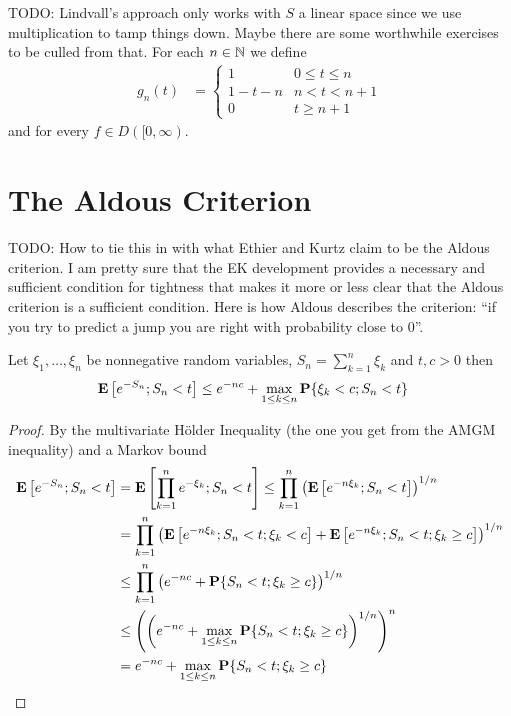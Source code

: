 TODO: Lindvall's approach only works with $S$ a linear space since we use multiplication to tamp things down.  Maybe there are some worthwhile exercises to be culled from that.
For each $n \in \mathbb{N}$ we define 
\begin{align*}
g_n(t) &= \begin{cases}
1 & 0 \leq t \leq n \\
1 - t - n & n < t < n + 1 \\
0 & t \geq n+1
\end{cases}
\end{align*}
and for every $f \in D([0,\infty)$.

\section{The Aldous Criterion}

TODO: How to tie this in with what Ethier and Kurtz claim to be the Aldous criterion.  I am pretty sure that the EK development provides a necessary and sufficient condition for tightness that makes it more or less clear that the Aldous criterion is a sufficient condition.
Here is how Aldous describes the criterion: ``if you try to predict a jump you are right with probability close to 0''.

\begin{lem}\label{AldousCriterionExponentialEstimate}Let $\xi_1, \dotsc, \xi_n$ be nonnegative random variables, $S_n = \sum_{k=1}^n \xi_k$ and $t,c > 0$ then
\begin{align*}
\textbf{E}\left[e^{-S_n}; S_n < t\right] &\leq e^{-nc} + \max_{1 \leq k \leq n} \textbf{P}\{\xi_k < c; S_n < t\}
\end{align*}
\end{lem}
\begin{proof}
By the multivariate H\"{o}lder Inequality (the one you get from the AMGM inequality) and a Markov bound
\begin{align*}
\textbf{E}\left[e^{-S_n}; S_n < t\right] &= \textbf{E}\left[\prod_{k=1}^n e^{-\xi_k}; S_n < t\right] \leq \prod_{k=1}^n\left(\textbf{E}\left[ e^{-n\xi_k}; S_n < t\right] \right)^{1/n} \\
&=\prod_{k=1}^n\left(\textbf{E}\left[ e^{-n\xi_k}; S_n < t; \xi_k < c\right] + \textbf{E}\left[ e^{-n\xi_k}; S_n < t; \xi_k \geq c\right] \right)^{1/n}  \\
&\leq\prod_{k=1}^n\left(e^{-nc}+ \textbf{P}\{S_n < t; \xi_k \geq c\} \right)^{1/n}  \\
&\leq \left(\left(e^{-nc} + \max_{1 \leq k \leq n} \textbf{P}\{S_n < t; \xi_k \geq c\} \right)^{1/n} \right)^n \\
&= e^{-nc} + \max_{1 \leq k \leq n} \textbf{P}\{S_n < t; \xi_k \geq c\} \\
\end{align*}
\end{proof}

